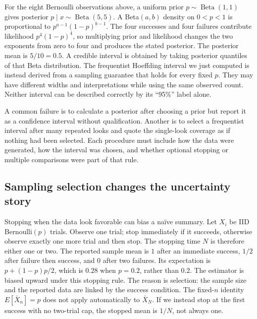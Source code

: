For the eight Bernoulli observations above, a uniform prior \(p\sim\operatorname{Beta}(1,1)\) gives posterior \(p\mid x\sim\operatorname{Beta}(5,5)\). A Beta\((a,b)\) density on \(0<p<1\) is proportional to \(p^{a-1}(1-p)^{b-1}\). The four successes and four failures contribute likelihood \(p^4(1-p)^4\), so multiplying prior and likelihood changes the two exponents from zero to four and produces the stated posterior. The posterior mean is \(5/10=0.5\). A credible interval is obtained by taking posterior quantiles of that Beta distribution. The frequentist Hoeffding interval we just computed is instead derived from a sampling guarantee that holds for every fixed \(p\). They may have different widths and interpretations while using the same observed count. Neither interval can be described correctly by its ``95\%'' label alone.

A common failure is to calculate a posterior after choosing a prior but report it as a confidence interval without qualification. Another is to select a frequentist interval after many repeated looks and quote the single-look coverage as if nothing had been selected. Each procedure must include how the data were generated, how the interval was chosen, and whether optional stopping or multiple comparisons were part of that rule.

\subsection{Sampling selection changes the uncertainty story}\label{03-visual-computing-i-ch012-sampling-selection-changes-the-uncertainty-story}

\hypertarget{03-visual-computing-i-ch012-sampling-selection-changes-the-uncertainty-story}{}

Stopping when the data look favorable can bias a naïve summary. Let \(X_i\) be IID Bernoulli\((p)\) trials. Observe one trial; stop immediately if it succeeds, otherwise observe exactly one more trial and then stop. The stopping time \(N\) is therefore either one or two. The reported sample mean is \(1\) after an immediate success, \(1/2\) after failure then success, and \(0\) after two failures. Its expectation is \(p+(1-p)p/2\), which is \(0.28\) when \(p=0.2\), rather than \(0.2\). The estimator is biased upward under this stopping rule. The reason is selection: the sample size and the reported data are linked by the success condition. The fixed-\(n\) identity \(E[\bar X_n]=p\) does not apply automatically to \(\bar X_N\). If we instead stop at the first success with no two-trial cap, the stopped mean is \(1/N\), not always one.

